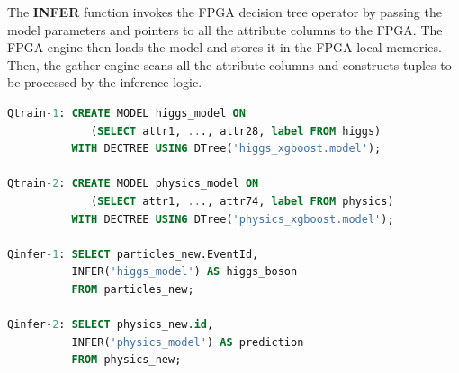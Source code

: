 \documentclass[11pt,dvipdfm]{article}
\begin{document}
The \textbf{INFER} function invokes the FPGA decision tree operator by passing the model parameters and pointers
to all the attribute columns to the FPGA. The FPGA engine then loads the model and stores it in the FPGA local memories. Then, the gather engine scans all the attribute columns and constructs tuples to be processed by the inference logic.




\begin{lstlisting}[frame=single,breaklines=true,language=sql,keywords={WHERE, AS, INFER,MODEL,FROM, SELECT, WITH, CREATE, USING, ON},label=dtquery ,caption=Training and inference queries for decision trees on the Higgs and Physics relations.,basicstyle=\small,label={lst:dtinfer}]
Qtrain-1: CREATE MODEL higgs_model ON 
             (SELECT attr1, ..., attr28, label FROM higgs)
          WITH DECTREE USING DTree('higgs_xgboost.model');

Qtrain-2: CREATE MODEL physics_model ON 
             (SELECT attr1, ..., attr74, label FROM physics)
          WITH DECTREE USING DTree('physics_xgboost.model');

Qinfer-1: SELECT particles_new.EventId, 
          INFER('higgs_model') AS higgs_boson
          FROM particles_new;

Qinfer-2: SELECT physics_new.id, 
          INFER('physics_model') AS prediction
          FROM physics_new;
\end{lstlisting}  
\end{document}
